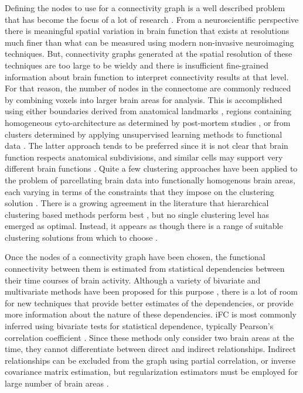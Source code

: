 \documentclass{bmcart}
\begin{document}
Defining the nodes to use for a connectivity graph is a well described problem that has become the focus of a lot of research \cite{Thirion2014}. From a neuroscientific perspective there is meaningful spatial variation in brain function that exists at resolutions much finer than what can be measured using modern non-invasive neuroimaging techniques. But, connectivity graphs generated at the spatial resolution of these techniques are too large to be wieldy and there is insufficient fine-grained information about brain function to interpret connectivity results at that level. For that reason, the number of nodes in the connectome are commonly reduced by combining voxels into larger brain areas for analysis. This is accomplished using either boundaries derived from anatomical landmarks \cite{Desikan2006,AAL2002}, regions containing homogeneous cyto-architecture as determined by post-mortem studies \cite{Eickhoff2008}, or from clusters determined by applying unsupervised learning methods to functional data \cite{Bellec2006,Craddock2012}. The latter approach tends to be preferred since it is not clear that brain function respects anatomical subdivisions, and similar cells may support very different brain functions \cite{Craddock2012}. Quite a few clustering approaches have been applied to the problem of parcellating brain data into functionally homogenous brain areas, each varying in terms of the constraints that they impose on the clustering solution  \cite{Craddock2012,Blumensath2013,Bellec2006,Thirion2006,Zalesky2010,Flandin2002,Thirion2014}. There is a growing agreement in the literature that hierarchical clustering based methods perform best \cite{Blumensath2013,Thirion2014}, but no single clustering level has emerged as optimal. Instead, it appears as though there is a range of suitable clustering solutions from which to choose  \cite{Craddock2012,Thirion2014}.  

Once the nodes of a connectivity graph have been chosen, the functional connectivity between them is estimated from statistical dependencies between their time courses of brain activity. Although a variety of bivariate and multivariate methods have been proposed for this purpose \cite{Smith2011,Varoquaux2013}, there is a lot of room for new techniques that provide better estimates of the dependencies, or provide more information about the nature of these dependencies. iFC is most commonly inferred using bivariate tests for statistical dependence, typically Pearson's correlation coefficient \cite{Biswal1995}. Since these methods only consider two brain areas at the time, they cannot differentiate between direct and indirect relationships. Indirect relationships can be excluded from the graph using partial correlation, or inverse covariance matrix estimation, but regularization estimators must be employed for large number of brain areas \cite{Ryali2012,Varoquaux2013}. 
\end{document}
